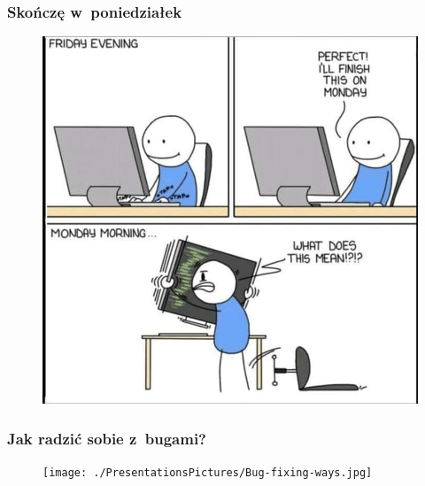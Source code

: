 \documentclass[10pt,t]{beamer}
\begin{document}
\begin{frame}
  \frametitle{Skończę w~poniedziałek}


  \begin{figure}

    \centering


    \includegraphics[scale=0.28]
    {./PresentationsPictures/I-will-finish-it-on-Monday.jpg}

  \end{figure}

\end{frame}





\begin{frame}
  \frametitle{Jak radzić sobie z~bugami?}


  \begin{figure}

    \centering


    \texttt{[image: ./PresentationsPictures/Bug-fixing-ways.jpg]}

  \end{figure}

\end{frame}
\end{document}
